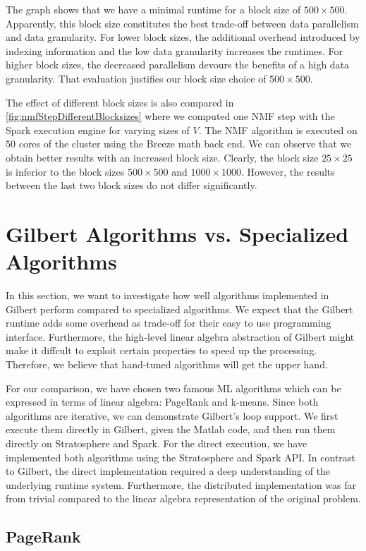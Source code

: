 The graph shows that we have a minimal runtime for a block size of $500 \times 500$.
Apparently, this block size constitutes the best trade-off between data parallelism and data granularity.
For lower block sizes, the additional overhead introduced by indexing information and the low data granularity increases the runtimes.
For higher block sizes, the decreased parallelism devours the benefits of a high data granularity.
That evaluation justifies our block size choice of $500 \times 500$.

The effect of different block sizes is also compared in \cref{fig:nmfStepDifferentBlocksizes} where we computed one NMF step with the Spark execution engine for varying sizes of $V$.
The NMF algorithm is executed on $50$ cores of the cluster using the Breeze math back end.
We can observe that we obtain better results with an increased block size.
Clearly, the block size $25 \times 25$ is inferior to the block sizes $500\times 500$ and $1000\times 1000$.
However, the results between the last two block sizes do not differ significantly.

\section{Gilbert Algorithms vs. Specialized Algorithms}

In this section, we want to investigate how well algorithms implemented in Gilbert perform compared to specialized algorithms.
We expect that the Gilbert runtime adds some overhead as trade-off for their easy to use programming interface.
Furthermore, the high-level linear algebra abstraction of Gilbert might make it diffcult to exploit certain properties to speed up the processing.
Therefore, we believe that hand-tuned algorithms will get the upper hand.

For our comparison, we have chosen two famous ML algorithms which can be expressed in terms of linear algebra: PageRank and k-means.
Since both algorithms are iterative, we can demonstrate Gilbert's loop support.
We first execute them directly in Gilbert, given the Matlab code, and then run them directly on Stratosphere and Spark.
For the direct execution, we have implemented both algorithms using the Stratosphere and Spark API.
In contrast to Gilbert, the direct implementation required a deep understanding of the underlying runtime system.
Furthermore, the distributed implementation was far from trivial compared to the linear algebra representation of the original problem.

\subsection{PageRank}

